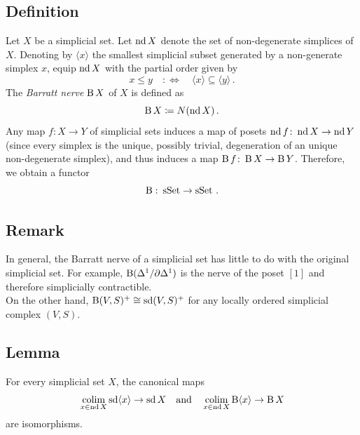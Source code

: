     \subsection{Definition}\label{chV-5-11}
        Let $X$ be a simplicial set. Let $\operatorname{nd} X$ denote the set of non-degenerate simplices of $X$. Denoting by $\langle x \rangle$ the smallest simplicial subset generated by a non-generate simplex $x$, equip $\operatorname{nd} X$ with the partial order given by
        \begin{equation*}
            x \leq y \quad :\Leftrightarrow \quad \langle x \rangle \subseteq \langle y \rangle \,.
        \end{equation*}
        The \emph{Barratt nerve} $\operatorname{B} X$ of $X$ is defined as
        \begin{equation*}
            \operatorname{B} X \coloneq N(\operatorname{nd} X) \,.
        \end{equation*}
        Any map $f \colon X \to Y$ of simplicial sets induces a map of posets $\operatorname{nd} f \colon \operatorname{nd} X \to \operatorname{nd} Y$ (since every simplex is the unique, possibly trivial, degeneration of an unique non-degenerate simplex), and thus induces a map $\operatorname{B} f \colon \operatorname{B} X \to \operatorname{B} Y$. Therefore, we obtain a functor
        \begin{equation*}
            \operatorname{B} \,\colon \operatorname{sSet} \to \operatorname{sSet} \,.
        \end{equation*}

    \subsection{Remark}\label{chV-5-12}
        In general, the Barratt nerve of a simplicial set has little to do with the original simplicial set. For example, $\operatorname{B} (\Delta^1 / \partial \Delta^1)$ is the nerve of the poset $[1]$ and therefore simplicially contractible.\\
        On the other hand, $\operatorname{B} (V, S)^{+} \cong \operatorname{sd}(V, S)^{+}$ for any locally ordered simplicial complex $(V, S)$.

    \subsection{Lemma}\label{chV-5-13}
        For every simplicial set $X$, the canonical maps
        \begin{equation*}
            \operatorname*{colim}\limits_{x \in \operatorname{nd} X} \operatorname{sd} \langle x \rangle \to \operatorname{sd} X \quad \text{and} \quad \operatorname*{colim}\limits_{x \in \operatorname{nd} X} \operatorname{B} \langle x \rangle \to \operatorname{B} X
        \end{equation*}
        are isomorphisms.
        \smallskip

